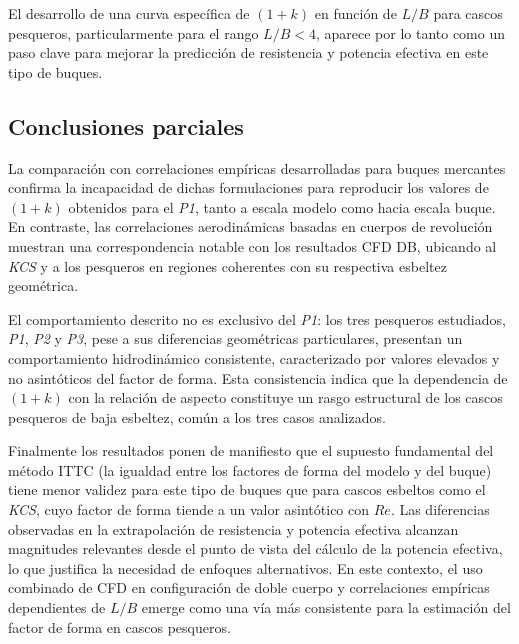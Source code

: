 El desarrollo de una curva específica de $(1+k)$ en función de $L/B$ para cascos pesqueros, particularmente para el rango $L/B < 4$, aparece por lo tanto como un paso clave para mejorar la predicción de resistencia y potencia efectiva en este tipo de buques.


\subsection{Conclusiones parciales}
 
La comparación con correlaciones empíricas desarrolladas para buques mercantes confirma la incapacidad de dichas formulaciones para reproducir los valores de $(1+k)$ obtenidos para el \textit{P1}, tanto a escala modelo como hacia escala buque. En contraste, las correlaciones aerodinámicas basadas en cuerpos de revolución muestran una correspondencia notable con los resultados CFD DB, ubicando al \textit{KCS} y a los pesqueros en regiones coherentes con su respectiva esbeltez geométrica.
 
El comportamiento descrito no es exclusivo del \textit{P1}: los tres 
pesqueros estudiados, \textit{P1}, \textit{P2} y \textit{P3}, pese a sus 
diferencias geométricas particulares, presentan un comportamiento 
hidrodinámico consistente, caracterizado por valores elevados y no 
asintóticos del factor de forma. Esta consistencia indica que la 
dependencia de $(1+k)$ con la relación de aspecto constituye un rasgo 
estructural de los cascos pesqueros de baja esbeltez, común a los tres 
casos analizados.
 
Finalmente los resultados ponen de manifiesto que el supuesto fundamental del método ITTC (la igualdad entre los factores de forma del modelo y del buque) tiene menor validez para este tipo de buques que para cascos esbeltos como el \textit{KCS}, cuyo factor de forma tiende a un valor asintótico con $Re$. Las diferencias observadas en la extrapolación de resistencia y potencia efectiva alcanzan magnitudes relevantes desde el punto de vista del cálculo de la potencia efectiva, lo que justifica la necesidad de enfoques alternativos. En este contexto, el uso combinado de CFD en configuración de doble cuerpo y correlaciones empíricas dependientes de $L/B$ emerge como una vía más consistente para la estimación del factor de forma en cascos pesqueros.